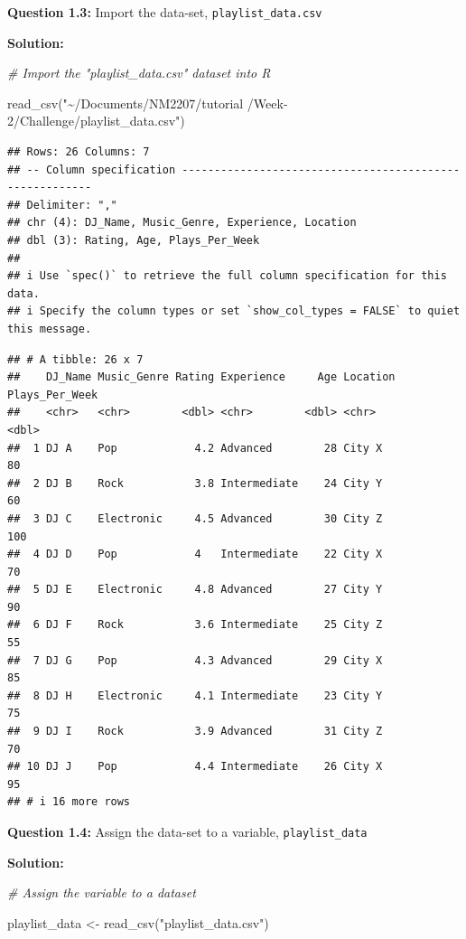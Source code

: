 \documentclass[
]{article}
\newenvironment{Shaded}{\begin{snugshade}}{\end{snugshade}}
\newcommand{\CommentTok}[1]{\textcolor[rgb]{0.56,0.35,0.01}{\textit{#1}}}
\newcommand{\FunctionTok}[1]{\textcolor[rgb]{0.00,0.00,0.00}{#1}}
\newcommand{\NormalTok}[1]{#1}
\newcommand{\OtherTok}[1]{\textcolor[rgb]{0.56,0.35,0.01}{#1}}
\newcommand{\StringTok}[1]{\textcolor[rgb]{0.31,0.60,0.02}{#1}}
\begin{document}
\textbf{Question 1.3:} Import the data-set, \texttt{playlist\_data.csv}

\textbf{Solution:}

\begin{Shaded}
\begin{Highlighting}[]
\CommentTok{\# Import the "playlist\_data.csv" dataset into R }

\FunctionTok{read\_csv}\NormalTok{(}\StringTok{"\textasciitilde{}/Documents/NM2207/tutorial /Week{-}2/Challenge/playlist\_data.csv"}\NormalTok{) }
\end{Highlighting}
\end{Shaded}

\begin{verbatim}
## Rows: 26 Columns: 7
## -- Column specification --------------------------------------------------------
## Delimiter: ","
## chr (4): DJ_Name, Music_Genre, Experience, Location
## dbl (3): Rating, Age, Plays_Per_Week
## 
## i Use `spec()` to retrieve the full column specification for this data.
## i Specify the column types or set `show_col_types = FALSE` to quiet this message.
\end{verbatim}

\begin{verbatim}
## # A tibble: 26 x 7
##    DJ_Name Music_Genre Rating Experience     Age Location Plays_Per_Week
##    <chr>   <chr>        <dbl> <chr>        <dbl> <chr>             <dbl>
##  1 DJ A    Pop            4.2 Advanced        28 City X               80
##  2 DJ B    Rock           3.8 Intermediate    24 City Y               60
##  3 DJ C    Electronic     4.5 Advanced        30 City Z              100
##  4 DJ D    Pop            4   Intermediate    22 City X               70
##  5 DJ E    Electronic     4.8 Advanced        27 City Y               90
##  6 DJ F    Rock           3.6 Intermediate    25 City Z               55
##  7 DJ G    Pop            4.3 Advanced        29 City X               85
##  8 DJ H    Electronic     4.1 Intermediate    23 City Y               75
##  9 DJ I    Rock           3.9 Advanced        31 City Z               70
## 10 DJ J    Pop            4.4 Intermediate    26 City X               95
## # i 16 more rows
\end{verbatim}

\textbf{Question 1.4:} Assign the data-set to a variable,
\texttt{playlist\_data}

\textbf{Solution:}

\begin{Shaded}
\begin{Highlighting}[]
\CommentTok{\# Assign the variable to a dataset }

\NormalTok{playlist\_data }\OtherTok{\textless{}{-}} \FunctionTok{read\_csv}\NormalTok{(}\StringTok{"playlist\_data.csv"}\NormalTok{) }
\end{Highlighting}
\end{Shaded}
\end{document}
